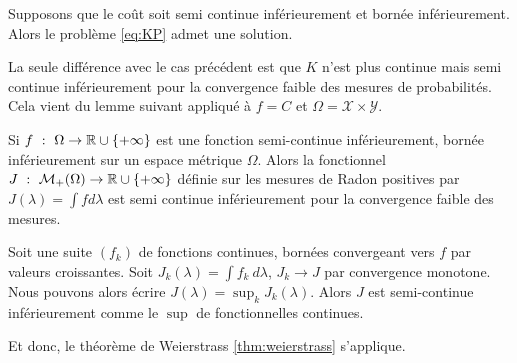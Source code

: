 \documentclass[a4paper,12pt]{article}
\begin{document}
\begin{proposition}
Supposons que le coût soit semi continue inférieurement et bornée inférieurement. Alors le problème \eqref{eq:KP} admet une solution. 
\end{proposition}
\begin{preuve}
La seule différence avec le cas précédent est que $K$ n'est plus continue mais semi continue inférieurement pour la convergence faible des mesures de probabilités. Cela vient du lemme suivant appliqué à $f = C$ et $\Omega = \mathcal{X}\times\mathcal{Y}$.
\begin{lemme}
Si $f\ :\ \Omega\rightarrow \mathbb{R}\cup\{+\infty\}$ est une fonction semi-continue inférieurement, bornée inférieurement sur un espace métrique $\Omega$. Alors la fonctionnel $J \ :\ \mathcal{M}_+(\Omega )\rightarrow \RR\cup\{+\infty\}$ définie sur les mesures de Radon positives par $J(\lambda) =\int f d\lambda$ est semi continue inférieurement pour la convergence faible des mesures. 
\end{lemme}
\begin{preuve}
Soit une suite $(f_k)$ de fonctions continues, bornées convergeant vers $f$ par valeurs croissantes. 
Soit $J_k(\lambda ) =\int f_k\ d\lambda$, $J_k\rightarrow J$ par convergence monotone. Nous pouvons alors écrire $J(\lambda )=\sup_k J_k(\lambda )$.
Alors $J$ est semi-continue inférieurement comme le $\sup$ de fonctionnelles continues.
\end{preuve}
Et donc, le théorème de Weierstrass \eqref{thm:weierstrass} s'applique.
\end{preuve}
\end{document}
